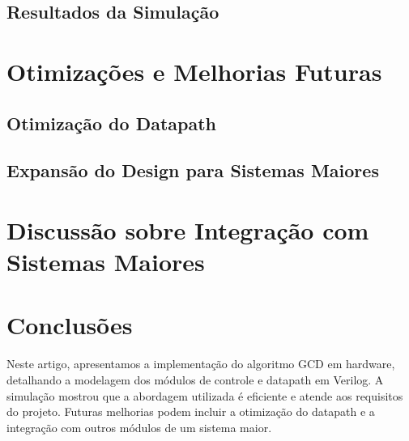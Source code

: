 \documentclass[a4paper,11pt]{article} %
\begin{document}
\subsection{Resultados da Simulação}

\section{Otimizações e Melhorias Futuras}

\subsection{Otimização do Datapath}

\subsection{Expansão do Design para Sistemas Maiores}

\section{Discussão sobre Integração com Sistemas Maiores}

\section{Conclusões}

Neste artigo, apresentamos a implementação do algoritmo GCD em hardware, detalhando a modelagem dos módulos de controle e datapath em Verilog. A simulação mostrou que a abordagem utilizada é eficiente e atende aos requisitos do projeto. Futuras melhorias podem incluir a otimização do datapath e a integração com outros módulos de um sistema maior.


\end{document}
